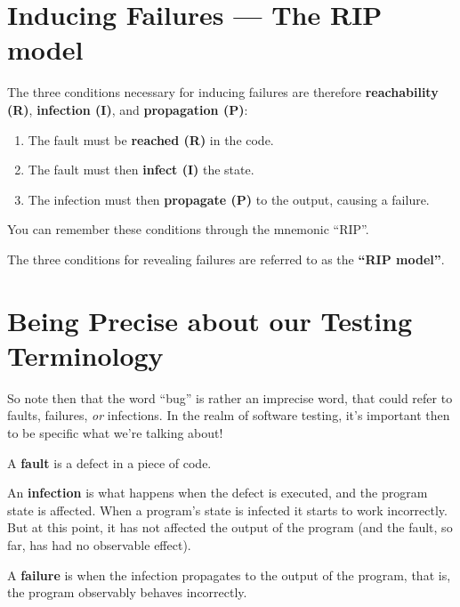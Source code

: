 
\section{Inducing Failures --- The RIP model}

The three conditions necessary for inducing failures are therefore {\bf
reachability (R)}, {\bf infection (I)}, and {\bf propagation (P)}:

\begin{enumerate}
    \item The fault must be {\bf reached (R)} in the code.
    
    \item The fault must then {\bf infect (I)} the state. 
    
    \item The infection must then {\bf propagate (P)} to the output, causing a
    failure.
\end{enumerate}


You can remember these conditions through the mnemonic ``RIP''. 

The three conditions for revealing failures are referred to as the {\bf ``RIP
model''}.


\section{Being Precise about our Testing Terminology}

So note then that the word ``bug'' is rather an imprecise word, that could refer
to faults, failures, {\it or} infections. In the realm of software testing, it's
important then to be specific what we're talking about!

A {\bf fault} is a defect in a piece of code. 

An {\bf infection} is what happens when the defect is executed, and the program
state is affected. When a program's state is infected it starts to work
incorrectly. But at this point, it has not affected the output of the program
(and the fault, so far, has had no observable effect).

A {\bf failure} is when the infection propagates to the output of the program,
that is, the program observably behaves incorrectly.

